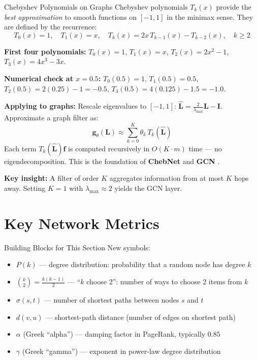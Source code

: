 \begin{mathbox}{Chebyshev Polynomials on Graphs}
Chebyshev polynomials $T_k(x)$ provide the \emph{best approximation} to smooth functions on $[-1,1]$ in the minimax sense. They are defined by the recurrence:
\[
T_0(x) = 1, \quad T_1(x) = x, \quad T_k(x) = 2x\,T_{k-1}(x) - T_{k-2}(x), \quad k \geq 2
\]

\textbf{First four polynomials:}
$T_0(x) = 1$, $T_1(x) = x$, $T_2(x) = 2x^2 - 1$, $T_3(x) = 4x^3 - 3x$.

\textbf{Numerical check at $x = 0.5$:}
$T_0(0.5)=1$, $T_1(0.5)=0.5$, $T_2(0.5)=2(0.25)-1=-0.5$, $T_3(0.5)=4(0.125)-1.5=-1.0$.

\textbf{Applying to graphs:} Rescale eigenvalues to $[-1,1]$: $\hat{\mathbf{L}} = \frac{2}{\lambda_{\max}}\mathbf{L} - \mathbf{I}$. Approximate a graph filter as:
\[
\mathbf{g}_\theta(\mathbf{L}) \approx \sum_{k=0}^{K} \theta_k\, T_k(\hat{\mathbf{L}})
\]
Each term $T_k(\hat{\mathbf{L}})\mathbf{f}$ is computed recursively in $O(K \cdot m)$ time --- no eigendecomposition. This is the foundation of \textbf{ChebNet} and \textbf{GCN} \cite{kipf2017}.

\textbf{Key insight:} A filter of order $K$ aggregates information from at most $K$ hops away. Setting $K=1$ with $\lambda_{\max} \approx 2$ yields the GCN layer.
\end{mathbox}

\section{Key Network Metrics}
\label{sec:network_metrics}

\begin{conceptbox}{Building Blocks for This Section}
New symbols:
\begin{itemize}[noitemsep]
    \item $P(k)$ --- degree distribution: probability that a random node has degree $k$
    \item $\binom{k}{2} = \frac{k(k-1)}{2}$ --- ``$k$ choose 2'': number of ways to choose 2 items from $k$
    \item $\sigma(s,t)$ --- number of shortest paths between nodes $s$ and $t$
    \item $d(v, u)$ --- shortest-path distance (number of edges on shortest path)
    \item $\alpha$ (Greek ``alpha'') --- damping factor in PageRank, typically $0.85$
    \item $\gamma$ (Greek ``gamma'') --- exponent in power-law degree distribution
\end{itemize}
\end{conceptbox}

